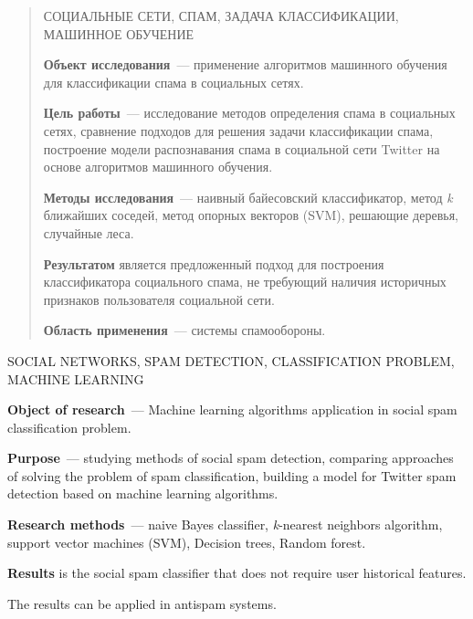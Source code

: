 
\clearpage
\begin{abstract}

СОЦИАЛЬНЫЕ СЕТИ, СПАМ, ЗАДАЧА КЛАССИФИКАЦИИ, МАШИННОЕ ОБУЧЕНИЕ

\textbf{Объект исследования}~--- применение алгоритмов машинного обучения для классификации спама в социальных сетях.

\textbf{Цель работы}~--- исследование методов определения спама в социальных сетях, сравнение подходов для решения задачи классификации спама, построение модели распознавания спама в социальной сети Twitter на основе алгоритмов машинного обучения.

\textbf{Методы исследования}~--- наивный байесовский классификатор, метод \textit{k} ближайших соседей, метод опорных векторов (SVM), решающие деревья, случайные леса.

\textbf{Результатом} является предложенный подход для построения классификатора социального спама, не требующий наличия историчных признаков пользователя социальной сети.

\textbf{Область применения}~--- системы спамообороны.
\end{abstract}


\pagebreak


\begin{abstract:en}

SOCIAL NETWORKS, SPAM DETECTION, CLASSIFICATION PROBLEM, MACHINE LEARNING

\textbf{Object of research}~--- Machine learning algorithms application in social spam classification problem.

\textbf{Purpose}~--- studying methods of social spam detection, comparing approaches of solving the problem of spam classification, building a model for Twitter spam detection based on machine learning algorithms.

\textbf{Research methods}~--- naive Bayes classifier, \textit{k}-nearest neighbors algorithm, support vector machines (SVM), Decision trees, Random forest.

\textbf{Results} is the social spam classifier that does not require user historical features.

The results can be applied in antispam systems.
\end{abstract:en}
